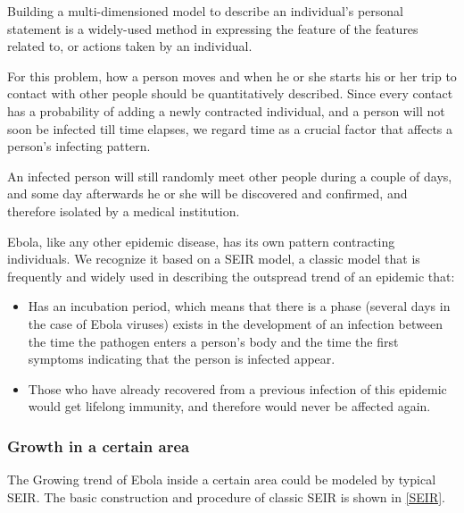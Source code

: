 \documentclass[12pt]{article}
\begin{document}
Building a multi-dimensioned model to describe an individual’s personal statement is a widely-used method in expressing the feature of the features related to, or actions taken by an individual.

For this problem, how a person moves and when he or she starts his or her trip to contact with other people should be quantitatively described. Since every contact has a probability of adding a newly contracted individual, and a person will not soon be infected till time elapses, we regard time as a crucial factor that affects a person’s infecting pattern.

An infected person will still randomly meet other people during a couple of days, and some day afterwards he or she will be discovered and confirmed, and therefore isolated by a medical institution.

Ebola, like any other epidemic disease, has its own pattern contracting individuals. We recognize it based on a SEIR model, a classic model that is frequently and widely used in describing the outspread trend of an epidemic that:
\begin{itemize}
\item Has an incubation period, which means that there is a phase (several days in the case of Ebola viruses) exists in the development of an infection between the time the pathogen enters a person's body and the time the first symptoms indicating that the person is infected appear.

\item Those who have already recovered from a previous infection of this epidemic would get lifelong immunity, and therefore would never be affected again.

\end{itemize}

\subsubsection{Growth in a certain area}

The Growing trend of Ebola inside a certain area could be modeled by typical SEIR. The basic construction and procedure of classic SEIR is shown in \ref{SEIR}.
\end{document}
